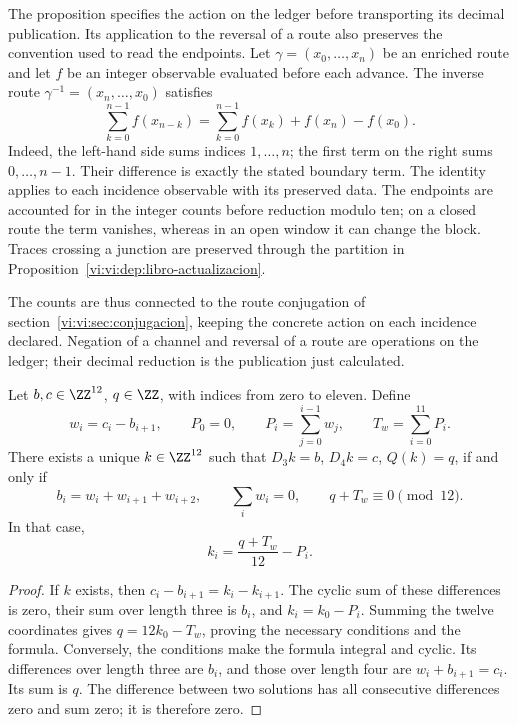 The proposition specifies the action on the ledger before transporting
its decimal publication. Its application to the reversal of a route
also preserves the convention used to read the endpoints. Let
\(\gamma=(x_0,\ldots,x_n)\) be an enriched route and let \(f\) be an
integer observable evaluated before each advance. The inverse route
\(\gamma^{-1}=(x_n,\ldots,x_0)\) satisfies
\begin{equation}
 \sum_{k=0}^{n-1}f(x_{n-k})
 =\sum_{k=0}^{n-1}f(x_k)+f(x_n)-f(x_0).
 \label{vi:vi:dep:conjugacion-frontera}
\end{equation}
Indeed, the left-hand side sums indices \(1,\ldots,n\);
the first term on the right sums \(0,\ldots,n-1\). Their difference
is exactly the stated boundary term. The identity applies
to each incidence observable with its preserved data. The endpoints
are accounted for in the integer counts before reduction modulo ten;
on a closed route the term vanishes, whereas in an open
window it can change the block. Traces crossing a junction
are preserved through the partition in
Proposition~\ref{vi:vi:dep:libro-actualizacion}.

The counts are thus connected to the route conjugation of
section~\ref{vi:vi:sec:conjugacion}, keeping the concrete action
on each incidence declared. Negation of a channel and reversal
of a route are operations on the ledger; their decimal reduction is the
publication just calculated.

\begin{proposition}
\label{vi:vi:dep:imagen-integral}
Let \(b,c\in\ZZ^{12}\), \(q\in\ZZ\), with indices from zero to eleven.
Define
\[
 w_i=c_i-b_{i+1},\qquad P_0=0,\qquad
 P_i=\sum_{j=0}^{i-1}w_j,\qquad T_w=\sum_{i=0}^{11}P_i.
\]
There exists a unique \(k\in\ZZ^{12}\) such that
\(D_3k=b\), \(D_4k=c\), \(Q(k)=q\), if and only if
\begin{equation}
 b_i=w_i+w_{i+1}+w_{i+2},\qquad
 \sum_iw_i=0,\qquad q+T_w\equiv0\pmod{12}.
 \label{vi:vi:dep:condiciones-imagen}
\end{equation}
In that case,
\begin{equation}
 k_i=\frac{q+T_w}{12}-P_i.
 \label{vi:vi:dep:inversa-incidencial}
\end{equation}
\end{proposition}
\begin{proof}
If \(k\) exists, then
\(c_i-b_{i+1}=k_i-k_{i+1}\). The cyclic sum of these differences
is zero, their sum over length three is \(b_i\), and
\(k_i=k_0-P_i\). Summing the twelve coordinates gives
\(q=12k_0-T_w\), proving the necessary conditions and the formula.
Conversely, the conditions make the formula integral and
cyclic. Its differences over length three are \(b_i\), and those over
length four are \(w_i+b_{i+1}=c_i\). Its sum is \(q\).
The difference between two solutions has all consecutive
differences zero and sum zero; it is therefore zero.
\end{proof}

